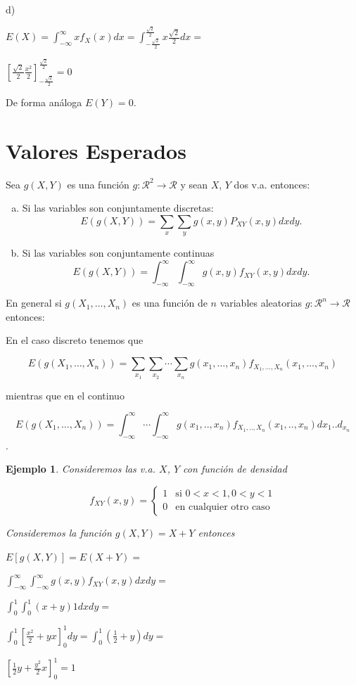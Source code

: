\documentclass[12pt]{report}
\newtheorem{example}[definition]{Ejemplo}
\begin{document}
       d)

       $\displaystyle{E(X)=\int_{-\infty}^\infty  x f_{X}(x) dx
=  \int_{- \frac{\sqrt{2}}{2}}^{\frac{\sqrt{2}}{2}} x \frac{\sqrt{2}}{2}
     dx=}$

     $\displaystyle{\left[\frac{\sqrt{2}}{2}
     \frac{x^2}{2}\right]_{- \frac{\sqrt{2}}{2}}^{\frac{\sqrt{2}}{2}} =0}
    $

     De forma análoga $E(Y)=0$.


    \section{Valores Esperados}
    Sea $g(X,Y)$ es una función
    $g:\mathcal{R}^2\to\mathcal{R}$ y sean $X$, $Y$ dos v.a. entonces:
\begin{enumerate}[a)]
\item Si las variables son conjuntamente discretas:
$$E(g(X,Y))=\sum_{x}\sum_{y} g(x,y)
    P_{XY}(x,y) dx dy.$$
\item Si las variables son conjuntamente continuas
    $$E(g(X,Y))=\int_{-\infty}^{\infty}\int_{-\infty}^{\infty} g(x,y)
    f_{XY}(x,y) dx dy.$$
\end{enumerate}
  En general si $g(X_{1},\ldots, X_{n})$ es una función de $n$
  variables aleatorias $g:\mathcal{R}^n\to \mathcal{R}$ entonces:

  En el caso discreto tenemos que 

  $$E(g(X_{1},\ldots, X_{n}))=\sum_{x_1}\sum_{x_2}\cdots \sum_{x_n}
   g(x_{1},\ldots, x_{n}) f_{X_{1},\ldots,X_{n}}(x_{1},\ldots,x_{n})$$

   mientras que en el continuo


  $$E(g(X_{1},\ldots, X_{n}))=\int_{-\infty}^{\infty}\cdots\int_{-\infty}^{\infty}
   g(x_{1},.., x_{n}) f_{X_{1},..,X_{n}}(x_{1},..,x_{n})d x_{1}..d_{x_{n}}$$.




    \begin{example}
Consideremos las v.a. $X$, $Y$ con función de densidad

    $$f_{XY}(x,y)=\left\{
\begin{array}{ll}
    1 & \mbox{si } 0<x<1, 0<y<1\\
    0 & \mbox{en cualquier otro caso}
    \end{array}\right.$$

    Consideremos la función $g(X,Y)=X+Y$ entonces

    $\displaystyle{E[g(X,Y)]=E(X+Y)=}$

    $\displaystyle{\int_{-\infty}^{\infty}\int_{-\infty}^{\infty} g(x,y)
    f_{XY}(x,y) dx dy=}$

    $\displaystyle{\int_{0}^{1}\int_{0}^{1} (x+y) 1 dx dy=}$

    $\displaystyle{
    \int_{0}^{1}\left[\frac{x^2}{2} + y x\right]_{0}^1 dy=
    \int_{0}^{1}(\frac{1}{2}+y) dy =}$

    $\displaystyle{\left[\frac{1}{2}y + \frac{y^2}{2}
    x\right]_{0}^1=1}$
    \end{example}
\end{document}
